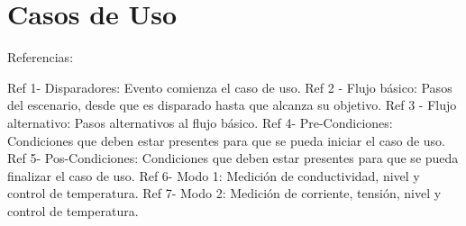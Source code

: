 
\chapter{Casos de Uso} %

\label{AppendixA} %

Referencias:

Ref 1-  Disparadores:  Evento comienza el caso de uso.
Ref 2 - Flujo básico:  Pasos del escenario, desde que es disparado hasta que alcanza su objetivo.
Ref 3 - Flujo alternativo:  Pasos alternativos al flujo básico. 
Ref 4-  Pre-Condiciones:  Condiciones que deben estar presentes para que se pueda iniciar el caso de uso.
Ref 5-  Pos-Condiciones: Condiciones que deben estar presentes para que se pueda finalizar el caso de uso.
Ref 6-  Modo 1: Medición de conductividad, nivel y control de temperatura.
Ref 7-  Modo 2: Medición de corriente, tensión, nivel y control de temperatura.

